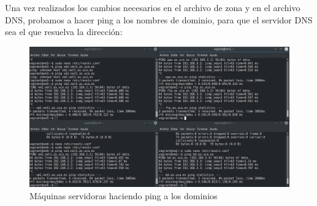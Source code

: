 \documentclass[12pt,letterpaper]{article}
\begin{document}
Una vez realizados los cambios necesarios en el archivo de zona y en el archivo DNS, probamos a hacer ping a los nombres de dominio, para que el servidor DNS sea el que resuelva la dirección:
\begin{figure}[h]
	\centering
	\includegraphics[scale=0.345]{Final.png}
	\caption{Máquinas servidoras haciendo ping a los dominios}
\end{figure}
\end{document}
